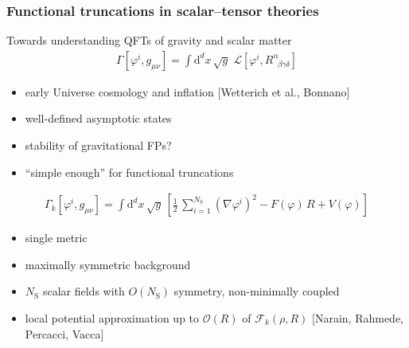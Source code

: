 \documentclass[]{beamer}  %
\newcommand\NS{ N_{\scriptscriptstyle{\mathrm{S}}} }
\begin{document}


\begin{frame}
  \frametitle{Functional truncations in scalar--tensor theories}

  Towards understanding QFTs of gravity and scalar matter
  \begin{align*}
      \Gamma[\varphi^i,g_{\mu\nu}]
      = \int \mathrm{d}^dx \, \sqrt{g} \; \mathcal{L}[\varphi^i,R^{\alpha}_{\;\;\beta\gamma\delta}]
  \end{align*}
  \begin{itemize}
    \item early Universe cosmology and inflation [Wetterich et al., Bonnano]
    \item well-defined asymptotic states
    \item stability of gravitational FPs?
    \item ``simple enough'' for functional truncations
  \end{itemize}

  \begin{align*}
    \boxed{
      \Gamma_k [\varphi^i,g_{\mu\nu}] =
      \int \mathrm d^dx \, \sqrt{g} \,
      \left[
          \frac{1}{2} \, \sum_{i=1}^{\NS} \left( \nabla\varphi^i \right)^2
        - F(\varphi) \, R
        + V(\varphi)
      \right]
    }
  \end{align*}

  \begin{itemize}
    \item single metric
    \item maximally symmetric background
    \item $\NS$ scalar fields with $O(\NS)$ symmetry, non-minimally coupled
    \item local potential approximation up to $\mathcal O(R)$ of $\mathcal F_k(\rho, R)$
  \hfill[Narain, Rahmede, Percacci, Vacca]
  \end{itemize}
\end{frame}


\end{document}
